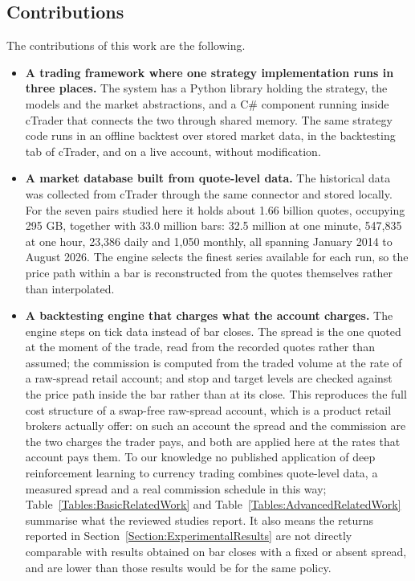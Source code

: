 \subsection{Contributions}

The contributions of this work are the following.

\begin{itemize}
\item \textbf{A trading framework where one strategy implementation runs in three places.} The system has a Python library holding the strategy, the models and the market abstractions, and a C\# component running inside cTrader \cite{noauthor_forex_nodate} that connects the two through shared memory. The same strategy code runs in an offline backtest over stored market data, in the backtesting tab of cTrader, and on a live account, without modification.

\item \textbf{A market database built from quote-level data.} The historical data was collected from cTrader through the same connector and stored locally. For the seven pairs studied here it holds about 1.66 billion quotes, occupying 295 GB, together with 33.0 million bars: 32.5 million at one minute, 547,835 at one hour, 23,386 daily and 1,050 monthly, all spanning January 2014 to August 2026. The engine selects the finest series available for each run, so the price path within a bar is reconstructed from the quotes themselves rather than interpolated.

\item \textbf{A backtesting engine that charges what the account charges.} The engine steps on tick data instead of bar closes. The spread is the one quoted at the moment of the trade, read from the recorded quotes rather than assumed; the commission is computed from the traded volume at the rate of a raw-spread retail account; and stop and target levels are checked against the price path inside the bar rather than at its close. This reproduces the full cost structure of a swap-free raw-spread account, which is a product retail brokers actually offer: on such an account the spread and the commission are the two charges the trader pays, and both are applied here at the rates that account pays them. To our knowledge no published application of deep reinforcement learning to currency trading combines quote-level data, a measured spread and a real commission schedule in this way; Table~\ref{Tables:BasicRelatedWork} and Table~\ref{Tables:AdvancedRelatedWork} summarise what the reviewed studies report. It also means the returns reported in Section~\ref{Section:ExperimentalResults} are not directly comparable with results obtained on bar closes with a fixed or absent spread, and are lower than those results would be for the same policy.


\end{itemize}
